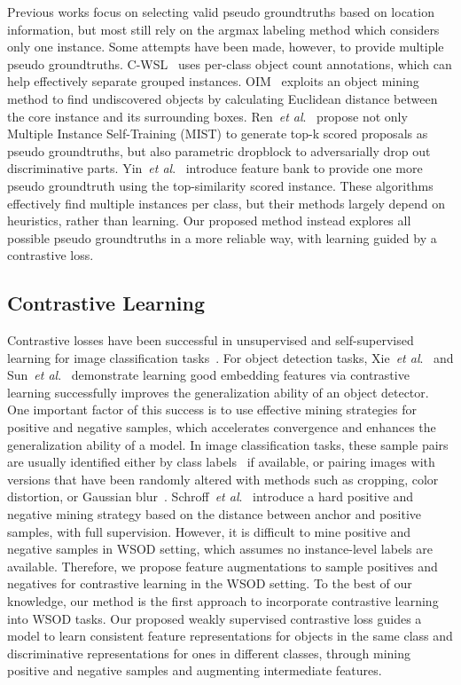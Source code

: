 \documentclass[runningheads]{llncs}
\makeatletter
\DeclareRobustCommand\onedot{\futurelet\@let@token\@onedot}
\def\onedot{.} \def\eg{\emph{e.g}\onedot, } \def\Eg{\emph{E.g}\onedot}
\def\etal{\emph{et al}\onedot}
\makeatother
\begin{document}
Previous works focus on selecting valid pseudo groundtruths based on location information, but most still rely on the argmax labeling method which considers only one instance.
Some attempts have been made, however, to provide multiple pseudo groundtruths.
C-WSL~\cite{Gao_2018_ECCV} uses per-class object count annotations, which can help effectively separate grouped instances.
OIM~\cite{lin2020object} exploits an object mining method to find undiscovered objects by calculating Euclidean distance between the core instance and its surrounding boxes.
Ren~\etal~\cite{ren2020instance} propose not only Multiple Instance Self-Training (MIST) to generate top-k scored proposals as pseudo groundtruths, but also parametric dropblock to adversarially drop out discriminative parts.
Yin~\etal~\cite{yin2021instance} introduce feature bank to provide one more pseudo groundtruth using the top-similarity scored instance.
These algorithms \cite{lin2020object,ren2020instance,yin2021instance} effectively find multiple instances per class, but their methods largely depend on heuristics, rather than learning.
Our proposed method instead explores all possible pseudo groundtruths in a more reliable way, with learning guided by a contrastive loss.

\subsection{Contrastive Learning}
Contrastive losses have been successful in
unsupervised and self-supervised learning for image classification tasks~\cite{chen2020simple,khosla2020supervised}.
For object detection tasks, Xie~\etal~\cite{xie2021detco} and Sun~\etal~\cite{sun2021fsce} demonstrate learning good embedding features via contrastive learning successfully improves the generalization ability of an object detector. 
One important factor of this success is to use effective mining strategies for positive and negative samples, which accelerates convergence and enhances the generalization ability of a model.
In image classification tasks, these sample pairs are usually identified either by class labels~\cite{khosla2020supervised} if available, or pairing images with versions that have been randomly altered with methods such as cropping, color distortion, or Gaussian blur~\cite{chen2020simple}. 
Schroff~\etal~\cite{schroff2015facenet} introduce a hard positive and negative mining strategy
based on the distance between anchor and positive samples, with full supervision.
However, it is difficult to mine positive and negative samples in WSOD setting, which assumes no instance-level labels are available.
Therefore, we propose feature augmentations to sample positives and negatives for contrastive learning in the WSOD setting.
To the best of our knowledge, our method is the first approach to incorporate contrastive learning into WSOD tasks.
Our proposed weakly supervised contrastive loss guides a model to learn consistent feature representations for objects in the same class and discriminative representations for ones in different classes, through mining positive and negative samples and augmenting intermediate features.
\end{document}
